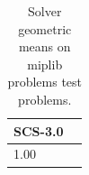 \begin{table}
\centering
\caption{Solver geometric means on miplib problems test problems.}
\label{t-miplib problems test-geom_mean}
\begin{tabular}{lc}
\toprule
 SCS-3.0 \\
\midrule
    1.00 \\
\bottomrule
\end{tabular}
\end{table}
